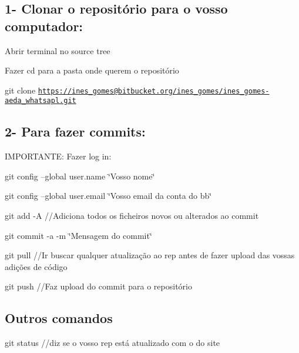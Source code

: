 \subsection*{1-\/ Clonar o repositório para o vosso computador\+:}


\begin{DoxyItemize}
\item Abrir terminal no source tree
\item Fazer cd para a pasta onde querem o repositório
\item git clone \href{https://ines_gomes@bitbucket.org/ines_gomes/ines_gomes-aeda_whatsapl.git}{\tt https\+://ines\+\_\+gomes@bitbucket.\+org/ines\+\_\+gomes/ines\+\_\+gomes-\/aeda\+\_\+whatsapl.\+git}
\end{DoxyItemize}

\subsection*{2-\/ Para fazer commits\+:}

I\+M\+P\+O\+R\+T\+A\+N\+T\+E\+: Fazer log in\+:


\begin{DoxyItemize}
\item git config --global user.\+name \char`\"{}\+Vosso nome\char`\"{}
\item git config --global user.\+email \char`\"{}\+Vosso email da conta do bb\char`\"{}
\item git add -\/\+A //\+Adiciona todos os ficheiros novos ou alterados ao commit
\item git commit -\/a -\/m \char`\"{}\+Mensagem do commit\char`\"{}
\item git pull //\+Ir buscar qualquer atualização ao rep antes de fazer upload das vossas adições de código
\item git push //\+Faz upload do commit para o repositório
\end{DoxyItemize}

\subsection*{Outros comandos}


\begin{DoxyItemize}
\item git status //diz se o vosso rep está atualizado com o do site 
\end{DoxyItemize}
